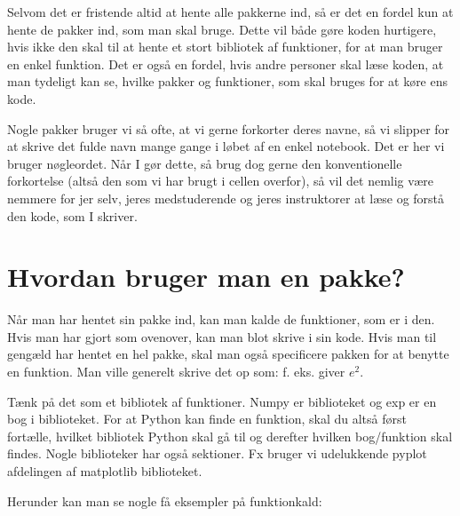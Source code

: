 \documentclass[letterpaper,10pt,english]{jupyterBook}
\begin{document}
Selvom det er fristende altid at hente alle pakkerne ind, så er det en fordel kun at hente de pakker ind, som man skal bruge. Dette vil både gøre koden hurtigere, hvis ikke den skal til at hente et stort bibliotek af funktioner, for at man bruger en enkel funktion. Det er også en fordel, hvis andre personer skal læse koden, at man tydeligt kan se, hvilke pakker og funktioner, som skal bruges for at køre ens kode.

Nogle pakker bruger vi så ofte, at vi gerne forkorter deres navne, så vi slipper for at skrive det fulde navn mange gange i løbet af en enkel notebook. Det er her vi bruger  nøgleordet. Når I gør dette, så brug dog gerne den konventionelle forkortelse (altså den som vi har brugt i cellen overfor), så vil det nemlig være nemmere for jer selv, jeres medstuderende og jeres instruktorer at læse og forstå den kode, som I skriver.


\section{Hvordan bruger man en pakke?}
\label{\detokenize{notebooks/Intro_til_pakker:hvordan-bruger-man-en-pakke}}
Når man har hentet sin pakke ind, kan man kalde de funktioner, som er i den. Hvis man har gjort som  ovenover, kan man blot skrive  i sin kode. Hvis man til gengæld har hentet en hel pakke, skal man også specificere pakken for at benytte en funktion. Man ville generelt skrive det op som:  f. eks.  giver \(e^2\).

Tænk på det som et bibliotek af funktioner. Numpy er biblioteket og exp er en bog i biblioteket. For at Python kan finde en funktion, skal du altså først fortælle, hvilket bibliotek Python skal gå til og derefter hvilken bog/funktion skal findes. Nogle biblioteker har også sektioner. Fx bruger vi udelukkende pyplot afdelingen af matplotlib biblioteket.

Herunder kan man se nogle få eksempler på funktionkald:

\begin{sphinxVerbatim}[commandchars=\\\{\}]
\end{sphinxVerbatim}
\end{document}
